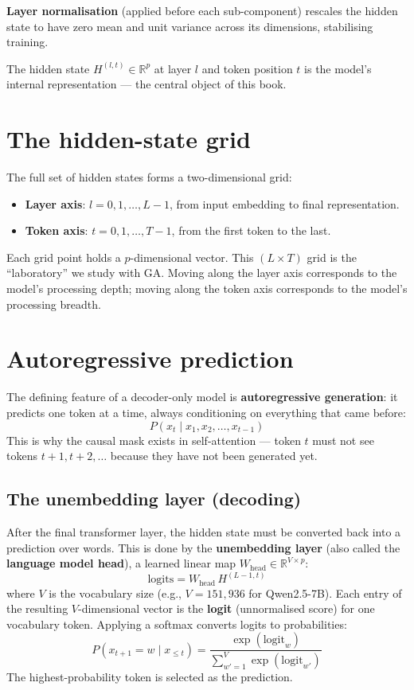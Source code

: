 \documentclass[11pt, twoside, openright]{memoir}
\begin{document}
\textbf{Layer normalisation} (applied before each sub-component)
rescales the hidden state to have zero mean and unit variance across
its dimensions, stabilising training.

The hidden state $H^{(l, t)} \in \mathbb{R}^p$ at layer $l$ and token
position $t$ is the model's internal representation --- the central
object of this book.

\section{The hidden-state grid}

The full set of hidden states forms a two-dimensional grid:
\begin{itemize}[nosep]
\item \textbf{Layer axis}: $l = 0, 1, \ldots, L-1$, from input
  embedding to final representation.
\item \textbf{Token axis}: $t = 0, 1, \ldots, T-1$, from the first
  token to the last.
\end{itemize}
Each grid point holds a $p$-dimensional vector.  This $(L \times T)$
grid is the ``laboratory'' we study with GA.  Moving along the layer
axis corresponds to the model's processing depth; moving along the
token axis corresponds to the model's processing breadth.

\section{Autoregressive prediction}

The defining feature of a decoder-only model is \textbf{autoregressive
generation}: it predicts one token at a time, always conditioning on
everything that came before:
\[
  P(x_t \mid x_1, x_2, \ldots, x_{t-1})
\]
This is why the causal mask exists in self-attention --- token $t$ must
not see tokens $t+1, t+2, \ldots$ because they have not been generated
yet.

\subsection*{The unembedding layer (decoding)}

After the final transformer layer, the hidden state must be converted
back into a prediction over words.  This is done by the
\textbf{unembedding layer} (also called the \textbf{language model
head}), a learned linear map
$W_{\mathrm{head}} \in \mathbb{R}^{V \times p}$:
\[
  \mathrm{logits} = W_{\mathrm{head}} \, H^{(L-1, t)}
\]
where $V$ is the vocabulary size (e.g., $V = 151{,}936$ for
Qwen2.5-7B).  Each entry of the resulting $V$-dimensional vector is
the \textbf{logit} (unnormalised score) for one vocabulary token.
Applying a softmax converts logits to probabilities:
\[
  P(x_{t+1} = w \mid x_{\le t})
    = \frac{\exp(\mathrm{logit}_w)}
           {\sum_{w'=1}^{V} \exp(\mathrm{logit}_{w'})}
\]
The highest-probability token is selected as the prediction.
\end{document}

